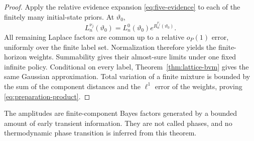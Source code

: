 \begin{proof}
Apply the relative evidence expansion
\eqref{eq:five-evidence} to each of the finitely many initial-state priors.
At \(\vartheta_0\),
\[
 L_n^{\nu_j}(\vartheta_0)
 =L_n^0(\vartheta_0)e^{R_n^{\nu_j}(\vartheta_0)}.
\]
All remaining Laplace factors are common up to a relative \(o_P(1)\) error,
uniformly over the finite label set.  Normalization therefore yields the
finite-horizon weights.  Summability gives their almost-sure limits under one
fixed infinite policy.  Conditional on every label, Theorem~\ref{thm:lattice-bvm}
gives the same Gaussian approximation.  Total variation of a finite mixture
is bounded by the sum of the component distances and the \(\ell^1\) error of
the weights, proving \eqref{eq:preparation-product}.
\end{proof}

\begin{remark}
The amplitudes are finite-component Bayes factors generated by a bounded
amount of early transient information.  They are not called phases, and no
thermodynamic phase transition is inferred from this theorem.
\end{remark}
